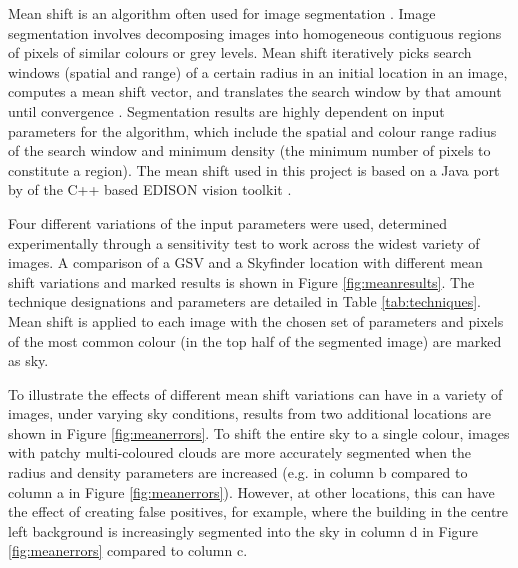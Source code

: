 \documentclass[final,3p,times,authoryear]{elsarticle}
\begin{document}
Mean shift is an algorithm often used for image segmentation \citep{Comaniciu1997,Comaniciu2002}. Image segmentation involves decomposing images into homogeneous contiguous regions of pixels of similar colours or grey levels. Mean shift iteratively picks search windows (spatial and range) of a certain radius in an initial location in an image, computes a mean shift vector, and translates the search window by that amount until convergence \citep{Comaniciu1997}. Segmentation results are highly dependent on input parameters for the algorithm, which include the spatial and colour range radius of the search window and minimum density (the minimum number of pixels to constitute a region). The mean shift used in this project is based on a Java port by \cite{Pangburn2002} of the C++ based EDISON vision toolkit \citep{Christoudias2002}. 

Four different variations of the input parameters were used, determined experimentally through a sensitivity test to work across the widest variety of images. A comparison of a GSV and a Skyfinder location with different mean shift variations and marked results is shown in Figure \ref{fig:meanresults}. The technique designations and parameters are detailed in Table \ref{tab:techniques}. Mean shift is applied to each image with the chosen set of parameters and pixels of the most common colour (in the top half of the segmented image) are marked as sky. 

To illustrate the effects of different mean shift variations can have in a variety of images, under varying sky conditions, results from two additional locations are shown in Figure \ref{fig:meanerrors}. To shift the entire sky to a single colour, images with patchy multi-coloured clouds are more accurately segmented when the radius and density parameters are increased (e.g. in column b compared to column a in Figure \ref{fig:meanerrors}). However, at other locations, this can have the effect of creating false positives, for example, where the building in the centre left background is increasingly segmented into the sky in column d in Figure \ref{fig:meanerrors} compared to column c. 


\end{document}
